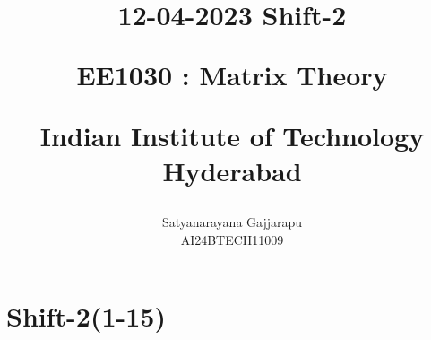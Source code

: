 \documentclass[journal]{IEEEtran}
\begin{document}

\vspace{3cm}




\title{
12-04-2023 Shift-2

\large{EE1030 : Matrix Theory}

Indian Institute of Technology Hyderabad
}
\author{Satyanarayana Gajjarapu

AI24BTECH11009
}	





\maketitle




\bigskip

\renewcommand{\thefigure}{\theenumi}
\renewcommand{\thetable}{\theenumi}


\section{\large Shift-2(1-15)}
\end{document}
